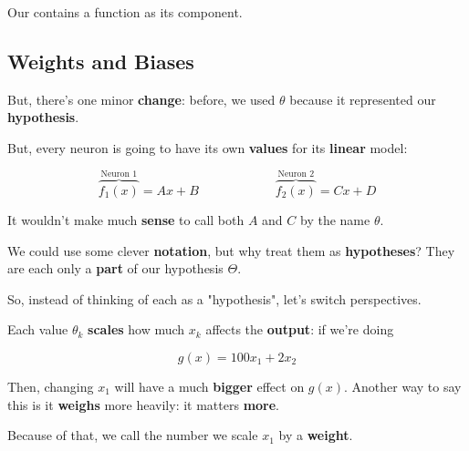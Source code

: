         \begin{concept}
            Our  contains a  function as its  component.
        \end{concept}
    
    \subsection{Weights and Biases}
    
        But, there's one minor \textbf{change}: before, we used $\theta$ because it represented our \textbf{hypothesis}. 
        
        But, every neuron is going to have its own \textbf{values} for its \textbf{linear} model:
        
        \begin{equation}
            \overbrace{
                f_1(x)
            }^{\text{Neuron 1}}
            = Ax+B 
            \qquad \qquad \qquad
            \overbrace{
                f_2(x)
            }^{\text{Neuron 2}}
            = Cx+D
        \end{equation}
        
        It wouldn't make much \textbf{sense} to call both $A$ and $C$ by the name $\theta$. 
        
        We could use some clever \textbf{notation}, but why treat them as \textbf{hypotheses}? They are each only a \textbf{part} of our hypothesis $\Theta$.
        
        So, instead of thinking of each as a "hypothesis", let's switch perspectives.
        
        Each value $\theta_k$ \textbf{scales} how much $x_k$ affects the \textbf{output}: if we're doing
        
        \begin{equation}
            g(x) = 100x_1+2x_2
        \end{equation}
        
        Then, changing $x_1$ will have a much \textbf{bigger} effect on $g(x)$. Another way to say this is it \textbf{weighs} more heavily: it matters \textbf{more}.
        
        Because of that, we call the number we scale $x_1$ by a \textbf{weight}.\\
        

